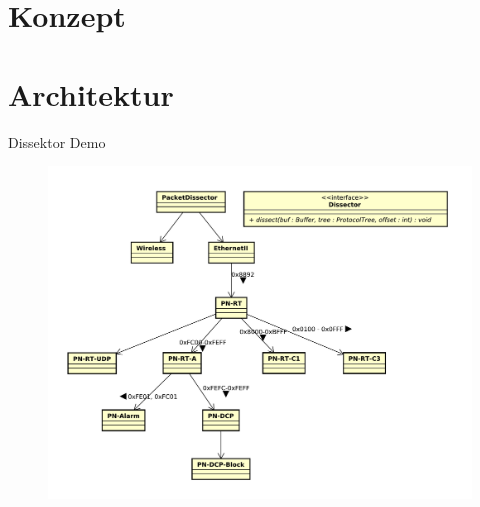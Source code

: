 \documentclass[18pt]{beamer}
\begin{document}
\section{Konzept}
    

\section{Architektur}
	
	
	
	
	
	

    \begin{frame}{Dissektor Demo}
        \begin{figure}
          \centering
          \includegraphics[height=0.8\textheight]{./images/dissector/7}
        \end{figure}
    \end{frame}

	
	
	
	
	
	
	
	
	
	
	
	
	
	
\end{document}
